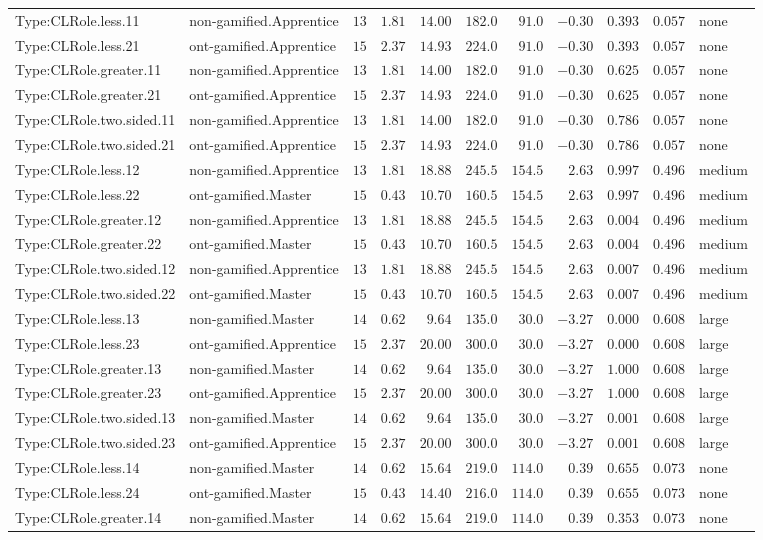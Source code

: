 \documentclass[6pt,a4paper]{article}
\begin{document}
{\begin{longtable}{llrrrrrrrrl}
Type:CLRole.less.11&non-gamified.Apprentice&$13$&$1.81$&$14.00$&$182.0$&$ 91.0$&$-0.30$&$0.393$&$0.057$&none\tabularnewline
Type:CLRole.less.21&ont-gamified.Apprentice&$15$&$2.37$&$14.93$&$224.0$&$ 91.0$&$-0.30$&$0.393$&$0.057$&none\tabularnewline
Type:CLRole.greater.11&non-gamified.Apprentice&$13$&$1.81$&$14.00$&$182.0$&$ 91.0$&$-0.30$&$0.625$&$0.057$&none\tabularnewline
Type:CLRole.greater.21&ont-gamified.Apprentice&$15$&$2.37$&$14.93$&$224.0$&$ 91.0$&$-0.30$&$0.625$&$0.057$&none\tabularnewline
Type:CLRole.two.sided.11&non-gamified.Apprentice&$13$&$1.81$&$14.00$&$182.0$&$ 91.0$&$-0.30$&$0.786$&$0.057$&none\tabularnewline
Type:CLRole.two.sided.21&ont-gamified.Apprentice&$15$&$2.37$&$14.93$&$224.0$&$ 91.0$&$-0.30$&$0.786$&$0.057$&none\tabularnewline
Type:CLRole.less.12&non-gamified.Apprentice&$13$&$1.81$&$18.88$&$245.5$&$154.5$&$ 2.63$&$0.997$&$0.496$&medium\tabularnewline
Type:CLRole.less.22&ont-gamified.Master&$15$&$0.43$&$10.70$&$160.5$&$154.5$&$ 2.63$&$0.997$&$0.496$&medium\tabularnewline
Type:CLRole.greater.12&non-gamified.Apprentice&$13$&$1.81$&$18.88$&$245.5$&$154.5$&$ 2.63$&$0.004$&$0.496$&medium\tabularnewline
Type:CLRole.greater.22&ont-gamified.Master&$15$&$0.43$&$10.70$&$160.5$&$154.5$&$ 2.63$&$0.004$&$0.496$&medium\tabularnewline
Type:CLRole.two.sided.12&non-gamified.Apprentice&$13$&$1.81$&$18.88$&$245.5$&$154.5$&$ 2.63$&$0.007$&$0.496$&medium\tabularnewline
Type:CLRole.two.sided.22&ont-gamified.Master&$15$&$0.43$&$10.70$&$160.5$&$154.5$&$ 2.63$&$0.007$&$0.496$&medium\tabularnewline
Type:CLRole.less.13&non-gamified.Master&$14$&$0.62$&$ 9.64$&$135.0$&$ 30.0$&$-3.27$&$0.000$&$0.608$&large\tabularnewline
Type:CLRole.less.23&ont-gamified.Apprentice&$15$&$2.37$&$20.00$&$300.0$&$ 30.0$&$-3.27$&$0.000$&$0.608$&large\tabularnewline
Type:CLRole.greater.13&non-gamified.Master&$14$&$0.62$&$ 9.64$&$135.0$&$ 30.0$&$-3.27$&$1.000$&$0.608$&large\tabularnewline
Type:CLRole.greater.23&ont-gamified.Apprentice&$15$&$2.37$&$20.00$&$300.0$&$ 30.0$&$-3.27$&$1.000$&$0.608$&large\tabularnewline
Type:CLRole.two.sided.13&non-gamified.Master&$14$&$0.62$&$ 9.64$&$135.0$&$ 30.0$&$-3.27$&$0.001$&$0.608$&large\tabularnewline
Type:CLRole.two.sided.23&ont-gamified.Apprentice&$15$&$2.37$&$20.00$&$300.0$&$ 30.0$&$-3.27$&$0.001$&$0.608$&large\tabularnewline
Type:CLRole.less.14&non-gamified.Master&$14$&$0.62$&$15.64$&$219.0$&$114.0$&$ 0.39$&$0.655$&$0.073$&none\tabularnewline
Type:CLRole.less.24&ont-gamified.Master&$15$&$0.43$&$14.40$&$216.0$&$114.0$&$ 0.39$&$0.655$&$0.073$&none\tabularnewline
Type:CLRole.greater.14&non-gamified.Master&$14$&$0.62$&$15.64$&$219.0$&$114.0$&$ 0.39$&$0.353$&$0.073$&none\tabularnewline

\end{longtable}}
\end{document}
